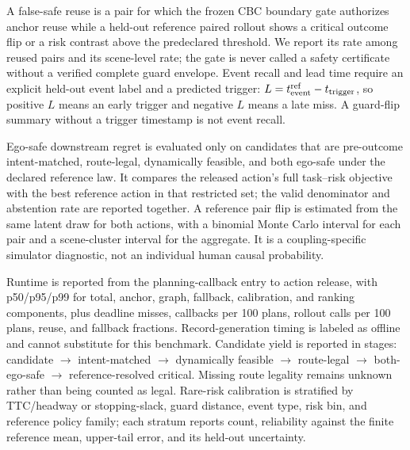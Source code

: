 \documentclass[10pt]{article}
\begin{document}
A false-safe reuse is a pair for which the frozen CBC boundary gate authorizes
anchor reuse while a held-out reference paired rollout shows a critical outcome
flip or a risk contrast above the predeclared threshold.  We report its rate
among reused pairs and its scene-level rate; the gate is never called a safety
certificate without a verified complete guard envelope.  Event recall and
lead time require an explicit held-out event label and a predicted trigger:
$L=t_{\rm event}^{\rm ref}-t_{\rm trigger}$, so positive $L$ means an early
trigger and negative $L$ means a late miss.  A guard-flip summary without a
trigger timestamp is not event recall.

Ego-safe downstream regret is evaluated only on candidates that are
pre-outcome intent-matched, route-legal, dynamically feasible, and both
ego-safe under the declared reference law.  It compares the released action's
full task--risk objective with the best reference action in that restricted
set; the valid denominator and abstention rate are reported together.  A
reference pair flip is estimated from the same latent draw for both actions,
with a binomial Monte Carlo interval for each pair and a scene-cluster interval
for the aggregate.  It is a coupling-specific simulator diagnostic, not an
individual human causal probability.

Runtime is reported from the planning-callback entry to action release, with
p50/p95/p99 for total, anchor, graph, fallback, calibration, and ranking
components, plus deadline misses, callbacks per 100 plans, rollout calls per
100 plans, reuse, and fallback fractions.  Record-generation timing is labeled
as offline and cannot substitute for this benchmark.  Candidate yield is
reported in stages: candidate $\rightarrow$ intent-matched $\rightarrow$
dynamically feasible $\rightarrow$ route-legal $\rightarrow$ both-ego-safe
$\rightarrow$ reference-resolved critical.  Missing route legality remains
unknown rather than being counted as legal.  Rare-risk calibration is
stratified by TTC/headway or stopping-slack, guard distance, event type,
risk bin, and reference policy family; each stratum reports count, reliability
against the finite reference mean, upper-tail error, and its held-out
uncertainty.
\end{document}
